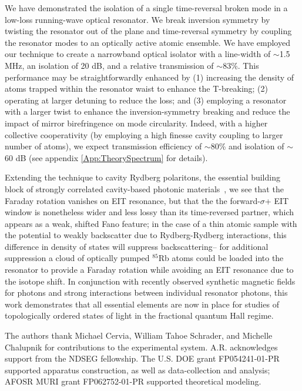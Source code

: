 \documentclass[aps,pra,twocolumn,groupedaddress,10pt,showpacs]{revtex4-1}
\begin{document}
We have demonstrated the isolation of a single time-reversal broken mode in a low-loss running-wave optical resonator. We break inversion symmetry by twisting the resonator out of the plane and time-reversal symmetry by  coupling the resonator modes to an optically active atomic ensemble. We have employed our technique to create a narrowband optical isolator with a line-width of $\sim$1.5 MHz, an isolation of 20 dB, and a relative transmission of $\sim$83\%. This performance may be straightforwardly enhanced by (1) increasing the density of atoms trapped within the resonator waist to enhance the T-breaking; (2) operating at larger detuning to reduce the loss; and (3) employing a resonator with a larger twist to enhance the inversion-symmetry breaking and reduce the impact of mirror birefringence on mode circularity. Indeed, with a higher collective cooperativity (by employing a high finesse cavity coupling to larger number of atoms), we expect transmission efficiency of $\sim$80\% and isolation of $\sim$ 60 dB (see appendix \ref{App:TheorySpectrum} for details).

Extending the technique to cavity Rydberg polaritons, the essential building block of strongly correlated cavity-based photonic materials~\cite{somm2015quan}, we see that the Faraday rotation vanishes on EIT resonance, but that the the forward-$\sigma$+ EIT window is nonetheless wider and less lossy than its time-reversed partner, which appears as a weak, shifted Fano feature; in the case of a thin atomic sample with the potential to weakly backscatter due to Rydberg-Rydberg interactions, this difference in density of states will suppress backscattering-- for additional suppression a cloud of optically pumped $^{85}$Rb atoms could be loaded into the resonator to provide a Faraday rotation while avoiding an EIT resonance due to the isotope shift. In conjunction with recently observed synthetic magnetic fields for photons \cite{schine2016synthetic} and strong interactions between individual resonator photons\cite{jia2017strongly}, this work demonstrates that all essential elements are now in place for studies of topologically ordered states of light in the fractional quantum Hall regime.

\begin{acknowledgments}
The authors thank Michael Cervia, William Tahoe Schrader, and Michelle Chalupnik for contributions to the experimental system. A.R. acknowledges support from the NDSEG fellowship. The U.S. DOE grant FP054241-01-PR supported apparatus construction, as well as data-collection and analysis; AFOSR MURI grant FP062752-01-PR supported theoretical modeling.
\end{acknowledgments}
\end{document}
